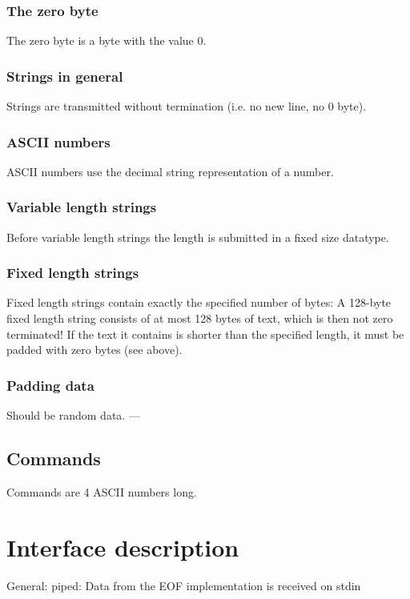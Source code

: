 \documentclass[12pt,a4paper]{book}
\begin{document}
\subsubsection{The zero byte}
The zero byte is a byte with the value 0.
\subsubsection{Strings in general}
Strings are transmitted without termination (i.e. no new line, no 0 byte).
\subsubsection{ASCII numbers}
ASCII numbers use the decimal string representation of a number.
\subsubsection{Variable length strings}
Before variable length strings the length is submitted in a fixed size
datatype.
\subsubsection{Fixed length strings}
Fixed length strings contain exactly the specified number of bytes:
A 128-byte fixed length string consists of at most 128 bytes of text,
which is then not zero terminated!
If the text it contains is shorter than the specified length,
it must be padded with zero bytes (see above).
\subsubsection{Padding data}
Should be random data.
---
\subsection{Commands}
Commands are 4 ASCII numbers long.
\section{Interface description}
General: piped:
Data from the EOF implementation is received on stdin 
\end{document}
